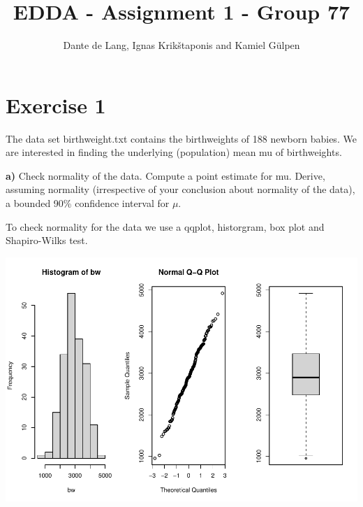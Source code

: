 \documentclass[
]{article}
\title{EDDA - Assignment 1 - Group 77}
\subtitle{Dante de Lang, Ignas Krikštaponis and Kamiel Gülpen}
\author{}
\date{\vspace{-2.5em}}
\newenvironment{Shaded}{\begin{snugshade}}{\end{snugshade}}
\newcommand{\AttributeTok}[1]{\textcolor[rgb]{0.77,0.63,0.00}{#1}}
\newcommand{\ConstantTok}[1]{\textcolor[rgb]{0.00,0.00,0.00}{#1}}
\newcommand{\DecValTok}[1]{\textcolor[rgb]{0.00,0.00,0.81}{#1}}
\newcommand{\FunctionTok}[1]{\textcolor[rgb]{0.00,0.00,0.00}{#1}}
\newcommand{\NormalTok}[1]{#1}
\newcommand{\OtherTok}[1]{\textcolor[rgb]{0.56,0.35,0.01}{#1}}
\newcommand{\SpecialCharTok}[1]{\textcolor[rgb]{0.00,0.00,0.00}{#1}}
\newcommand{\StringTok}[1]{\textcolor[rgb]{0.31,0.60,0.02}{#1}}
\begin{document}
\maketitle

\hypertarget{exercise-1}{%
\section{Exercise 1}\label{exercise-1}}

The data set birthweight.txt contains the birthweights of 188 newborn
babies. We are interested in finding the underlying (population) mean mu
of birthweights.

\textbf{a)} Check normality of the data. Compute a point estimate for
mu. Derive, assuming normality (irrespective of your conclusion about
normality of the data), a bounded 90\% confidence interval for \(\mu\).

To check normality for the data we use a qqplot, historgram, box plot
and Shapiro-Wilks test.

\begin{Shaded}
\end{Shaded}

\includegraphics{Assignment-1_files/figure-latex/unnamed-chunk-1-1.pdf}
\end{document}
